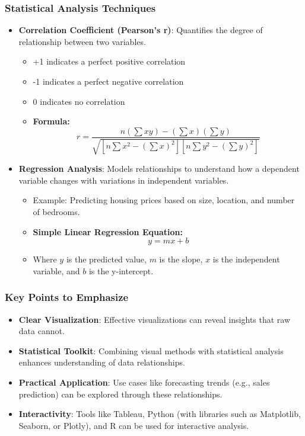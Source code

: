\documentclass[aspectratio=169]{beamer}
\begin{document}
\begin{frame}[fragile]
    \frametitle{Statistical Analysis Techniques}
    \begin{itemize}
        \item \textbf{Correlation Coefficient (Pearson's r)}: Quantifies the degree of relationship between two variables.
        \begin{itemize}
            \item +1 indicates a perfect positive correlation
            \item -1 indicates a perfect negative correlation
            \item 0 indicates no correlation
            \item \textbf{Formula:}
            \begin{equation}
                r = \frac{n(\sum xy) - (\sum x)(\sum y)}{\sqrt{[n\sum x^2 - (\sum x)^2][n\sum y^2 - (\sum y)^2]}}
            \end{equation}
        \end{itemize}
        
        \item \textbf{Regression Analysis}: Models relationships to understand how a dependent variable changes with variations in independent variables.
        \begin{itemize}
            \item Example: Predicting housing prices based on size, location, and number of bedrooms.
            \item \textbf{Simple Linear Regression Equation:}
            \begin{equation}
                y = mx + b
            \end{equation}
            \item Where \( y \) is the predicted value, \( m \) is the slope, \( x \) is the independent variable, and \( b \) is the y-intercept.
        \end{itemize}
    \end{itemize}
\end{frame}

\begin{frame}[fragile]
    \frametitle{Key Points to Emphasize}
    \begin{itemize}
        \item \textbf{Clear Visualization}: Effective visualizations can reveal insights that raw data cannot.
        \item \textbf{Statistical Toolkit}: Combining visual methods with statistical analysis enhances understanding of data relationships.
        \item \textbf{Practical Application}: Use cases like forecasting trends (e.g., sales prediction) can be explored through these relationships.
        \item \textbf{Interactivity}: Tools like Tableau, Python (with libraries such as Matplotlib, Seaborn, or Plotly), and R can be used for interactive analysis.
    \end{itemize}
\end{frame}
\end{document}
